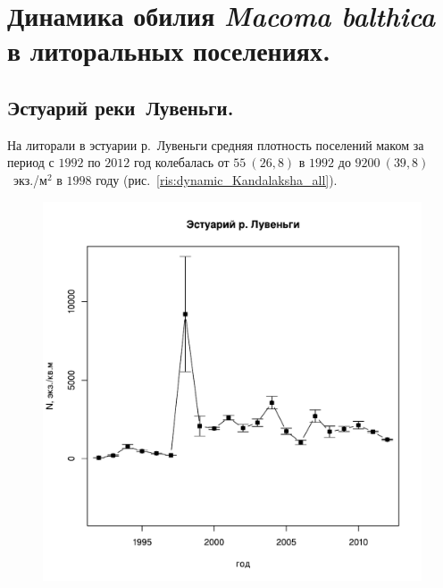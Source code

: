 	\chapter{Динамика обилия {\it Macoma balthica} в литоральных поселениях.}

		\section{Эстуарий реки~Лувеньги.}


На литорали в эстуарии р.~Лувеньги средняя плотность поселений маком за период с $1992$ по $2012$ год колебалась от $55~(26,8)$ в $1992$ до $9200~(39,8)$~экз./м$^2$ в $1998$ году (рис.~\ref{ris:dynamic_Kandalaksha_all}). 
	\begin{figure}[p]
	
	\begin{minipage}[b]{.49\linewidth}
	\begin{center}
	\includegraphics[width=\linewidth]{../White_Sea/Estuatiy_Luvenga/N_dynamic1.pdf}


\end{center}
\end{minipage}
\end{figure}
